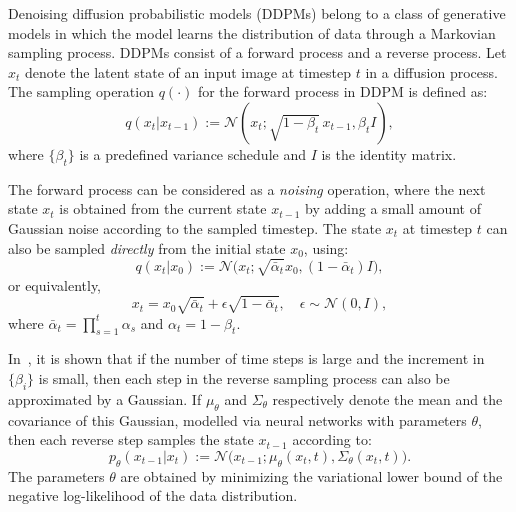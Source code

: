 \documentclass[10pt,twocolumn,letterpaper]{article}
\begin{document}
Denoising diffusion probabilistic models (DDPMs) \cite{sohl2015deep,ho2020denoising} belong to a class of generative models in which the model learns the distribution of data through a Markovian sampling process. DDPMs consist of a forward process and a reverse process. Let $x_t$ denote the latent state of an input image at timestep $t$ in a diffusion process. The sampling operation $q(\cdot)$ for the forward process in DDPM is defined as:
\begin{equation}
    q(x_t|x_{t-1}) := \mathcal{N}(x_t; \sqrt{1-\beta_t} \, x_{t-1}, \beta_t I),
    \label{eq:q_sample}
\end{equation}
where $\{\beta_t\}$ is a predefined variance schedule and $I$ is the identity matrix. 
 
The forward process can be considered as a \emph{noising} operation, where the next state $x_t$ is obtained from the current state $x_{t-1}$ by adding a small amount of Gaussian noise according to the sampled timestep. The state $x_t$ at timestep $t$ can also be sampled \emph{directly} from the initial state $x_0$, using: 
\begin{equation}
    q(x_t|x_{0}) := \mathcal{N}\big(x_t; \sqrt{\bar{\alpha}_t} x_0, (1-\bar{\alpha}_t) I\big),
    \label{eq:q_sample0}
\end{equation}
\noindent or equivalently,
\begin{equation}
    x_t = x_0 \sqrt{\bar{\alpha}_t}  + \epsilon \sqrt{1-\bar{\alpha}_t}, \quad \epsilon \sim \mathcal{N}(0, I),
\end{equation}
where $\bar{\alpha}_t=\prod_{s=1}^t\alpha_s$ and $\alpha_t=1-\beta_t$.

In~\cite{sohl2015deep}, it is shown that if the number of time steps is large and the increment in $\{\beta_i\}$ is small, then each step in the reverse sampling process can also be approximated by a Gaussian. If $\mu_\theta$ and $\Sigma_\theta$ respectively denote the mean and the covariance of this Gaussian, modelled via neural networks with parameters $\theta$, then each reverse step samples the state $x_{t-1}$ according to:
\begin{equation}
    p_{\theta}(x_{t-1}|x_t) := \mathcal{N}\big(x_{t-1}; \mu_{\theta}(x_t,t),\Sigma_{\theta}(x_t,t)\big). 
\end{equation}
The parameters $\theta$ are obtained by minimizing the variational lower bound of the negative log-likelihood of the data distribution. 
\end{document}
